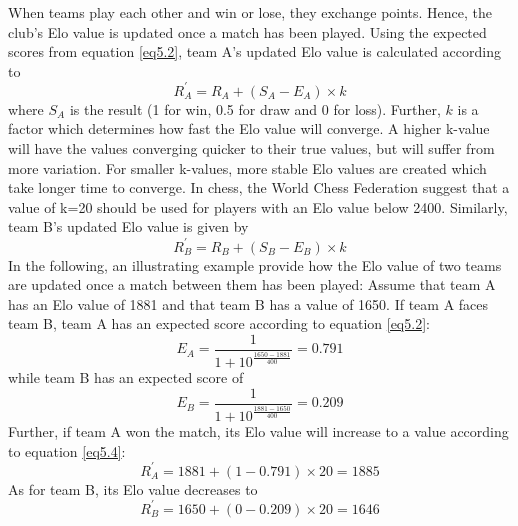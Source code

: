 \newpar
When teams play each other and win or lose, they exchange points. Hence, the club's Elo value is updated once a match has been played. Using the expected scores from equation \ref{eq5.2}, team A's updated Elo value is calculated according to
\begin{equation} \label{eq5.4}
    R^{'}_A = R_A + (S_A-E_A) \times k
\end{equation}
where $S_A$ is the result (1 for win, 0.5 for draw and 0 for loss). Further, $k$ is a factor which determines how fast the Elo value will converge. A higher k-value will have the values converging quicker to their true values, but will suffer from more variation. For smaller k-values, more stable Elo values are created which take longer time to converge. In chess, the World Chess Federation suggest that a value of k=20 should be used for players with an Elo value below 2400. 
\newpar
Similarly, team B's updated Elo value is given by
\begin{equation} \label{eq5.5}
    R^{'}_B = R_B + (S_B-E_B) \times k
\end{equation}
\newpar
In the following, an illustrating example provide how the Elo value of two teams are updated once a match between them has been played:
\newpar
Assume that team A has an Elo value of 1881 and that team B has a value of 1650. If team A faces team B, team A has an expected score according to equation \ref{eq5.2}:
\begin{equation*}
    E_A = \frac{1}{1+10^{\frac{1650-1881}{400}}} = 0.791
\end{equation*}
while team B has an expected score of
\begin{equation*}
    E_B = \frac{1}{1+10^{\frac{1881-1650}{400}}} = 0.209
\end{equation*}
Further, if team A won the match, its Elo value will increase to a value according to equation \ref{eq5.4}: 
\begin{equation*}
   R^{'}_A= 1881 + (1-0.791) \times 20 = 1885
\end{equation*}
As for team B, its Elo value decreases to
\begin{equation*}
   R^{'}_B = 1650 + (0-0.209) \times 20 = 1646 
\end{equation*}

